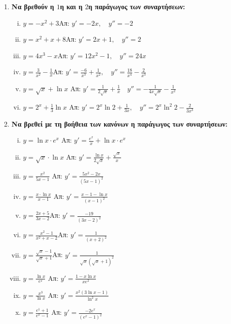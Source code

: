 


\everymath{\displaystyle}
\geometry{margin=2cm}
\thispagestyle{empty}



\begin{center}
\end{center}

\vspace{\baselineskip}



\begin{enumerate}
	\item {\bfseries Να βρεθούν η $1$η και η $2$η παράγωγος των συναρτήσεων:}
\begin{enumerate}[i)]
\item $y=-x^2+3$\hfill Απ: $y'=-2x,\quad y''=-2$
\item $y=x^2+x+8$\hfill Απ: $y'=2x+1,\quad y''=2$
\item $y= 4x^3-x$\hfill Απ: $y'=12x^2-1,\quad y''=24x$
\item $y= \frac{3}{x^{2}} -\frac{1}{x}$\hfill Απ: $y'=\frac{-6}{x^3}+\frac{1}{x^2},\quad y''= \frac{18}{x^4}-\frac{2}{x^3}$
\item $ y= \sqrt{ x } + \ln{x} $ \hfill Απ: $ y'= \frac{1}{2 \sqrt{ x }} + \frac{1}{x}\quad y''=-
	\frac{1}{4x \sqrt{ x }}- \frac{1}{x^{2}}  $ 
\item $ y = 2^{x} + \frac{1}{3} \ln{x} $ \hfill Απ: $ y' = 2^{x}\ln{2} + \frac{1}{3x}, \quad y'' =
	2^{x}\ln^{2}2 - \frac{2}{3x^{3}}  $
\end{enumerate}

\item {\bfseries Να βρεθεί με τη βοήθεια των κανόνων η παράγωγος των συναρτήσεων:}

\begin{enumerate}[i)]
	\item $ y= \ln{x} \cdot e^{x} $ \hfill Απ: $ y'= \frac{e^{x}}{x} + \ln{x}\cdot e^{x} $ 
	\item $ y= \sqrt{x}\cdot \ln{x} $ \hfill Απ: $ y'= \frac{\ln{x}}{2 \sqrt{ x }}  + 
		\frac{\sqrt{ x }}{x} $ 
	\item $ y= \frac{x^{2}}{5x-1} $ \hfill Απ: $ y'= \frac{5x^{2}-2x}{(5x-1)^{2}} $  
	\item $ y = \frac{x\cdot \ln{x}}{x-1} $ \hfill Απ: $ y' = \frac{x-1- \ln{x}}{(x-1)^{2}} $ 
\item $y=\frac{2x+5}{3x-2}$\hfill Απ: $y'=\frac{-19}{(3x-2)^2}$
\item $y=\frac{x^2-1}{x^2+x-2}$\hfill Απ: $y'=\frac{1}{(x+2)^2}$
\item $y=\frac{\sqrt{x}-1}{\sqrt{x}+1}$\hfill Απ: $y'=\frac{1}{\sqrt{x}(\sqrt{x}+1)^2}$
\item $ y= \frac{\ln{x}}{e^{x}} $ \hfill Απ: $ y'= \frac{1 - x \ln{x}}{xe^{2}} $ 
\item $ y= \frac{x^{3}}{\ln{x}} $ \hfill Απ: $ y' = \frac{x^{2}(3 \ln{x} -1)}{\ln^{2}{x} } $ 
\item $ y= \frac{e^{1}+1}{e^{x}-1} $ \hfill Απ: $ y'= \frac{-2e^{x}}{(e^{x}-1)^{2}} $ 
\end{enumerate}





\end{enumerate}
